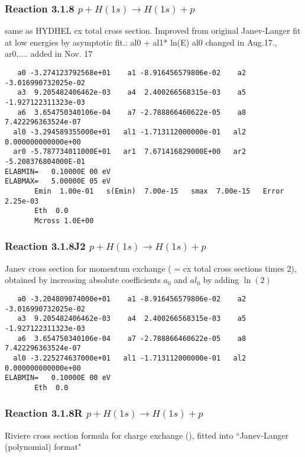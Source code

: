 \documentclass[12pt,dvipdfmx]{article}
\begin{document}
\subsubsection{
Reaction 3.1.8 $  p + H(1s) \rightarrow H(1s) + p  $
}
same as HYDHEL cx total cross section.
Improved from original Janev-Langer fit at low energies by asymptotic fit.:  al0 + al1* ln(E)
al0 changed in Aug.17., ar0,.... added in Nov. 17

\begin{small}\begin{verbatim}
   a0 -3.274123792568e+01    a1 -8.916456579806e-02    a2 -3.016990732025e-02
   a3  9.205482406462e-03    a4  2.400266568315e-03    a5 -1.927122311323e-03
   a6  3.654750340106e-04    a7 -2.788866460622e-05    a8  7.422296363524e-07
  al0 -3.294589355000e+01   al1 -1.713112000000e-01   al2  0.000000000000e+00
  ar0 -5.787734011000E+01   ar1  7.671416829000E+00   ar2 -5.208376804000E-01
ELABMIN=   0.10000E 00 eV
ELABMAX=   5.00000E 05 eV
       Emin  1.00e-01   s(Emin)  7.00e-15   smax  7.00e-15   Error  2.25e-03
       Eth  0.0
       Mcross 1.0E+00
\end{verbatim}\end{small}
\subsubsection{
Reaction 3.1.8J2 $  p + H(1s) \rightarrow H(1s) + p  $
}
Janev cross section for momentum exchange ( = cx total cross sections times 2), obtained by
increasing absolute coefficients $a_0$ and $al_0$  by adding $\ln(2)$

\begin{small}\begin{verbatim}
   a0 -3.204809074000e+01    a1 -8.916456579806e-02    a2 -3.016990732025e-02
   a3  9.205482406462e-03    a4  2.400266568315e-03    a5 -1.927122311323e-03
   a6  3.654750340106e-04    a7 -2.788866460622e-05    a8  7.422296363524e-07
  al0 -3.225274637000e+01   al1 -1.713112000000e-01   al2  0.000000000000e+00
ELABMIN=   0.10000E 00 eV
       Eth  0.0
\end{verbatim}\end{small}
\subsubsection{
Reaction 3.1.8R $  p + H(1s) \rightarrow H(1s) + p  $
}
Riviere cross section formula for charge exchange
(\cite{kn:Riviere}), fitted into
``Janev-Langer (polynomial) format" \cite{kn:Janev}
\end{document}
